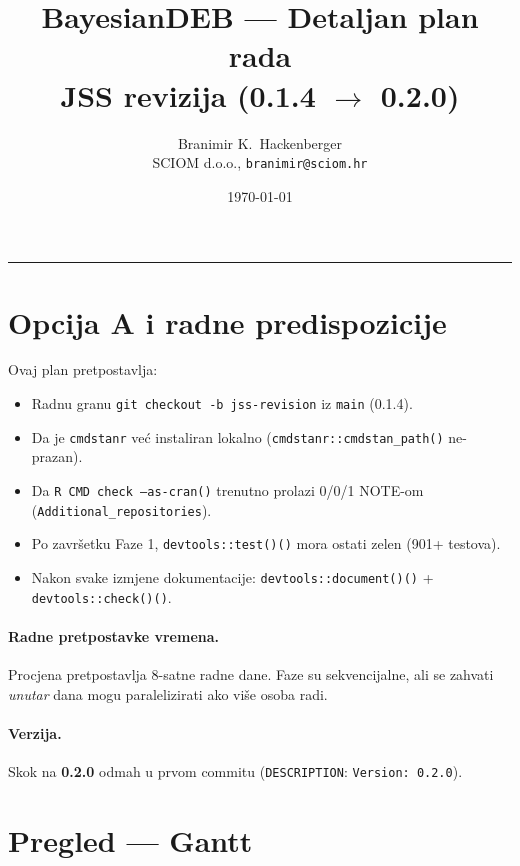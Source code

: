 \documentclass[11pt,a4paper]{article}
\title{\textbf{BayesianDEB --- Detaljan plan rada \\ \large JSS revizija (0.1.4 $\rightarrow$ 0.2.0)}}
\author{Branimir K.~Hackenberger \\ \small SCIOM d.o.o., \texttt{branimir@sciom.hr}}
\date{\today}
\newcommand{\file}[1]{\texttt{\small #1}}
\newcommand{\fn}[1]{\texttt{\small #1()}}
\newcommand{\code}[1]{\texttt{\small #1}}
\begin{document}
\maketitle
\thispagestyle{fancy}

\tableofcontents
\bigskip\hrule\bigskip

\section{Opcija A i radne predispozicije}

Ovaj plan pretpostavlja:
\begin{itemize}[leftmargin=1.4em,nosep]
  \item Radnu granu \code{git checkout -b jss-revision} iz \code{main} (0.1.4).
  \item Da je \code{cmdstanr} već instaliran lokalno
    (\code{cmdstanr::cmdstan\_path()} ne-prazan).
  \item Da \fn{R CMD check --as-cran} trenutno prolazi 0/0/1
    NOTE-om (\texttt{Additional\_repositories}).
  \item Po završetku Faze 1, \fn{devtools::test()} mora ostati zelen
    (901+ testova).
  \item Nakon svake izmjene dokumentacije: \fn{devtools::document()} +
    \fn{devtools::check()}.
\end{itemize}

\paragraph{Radne pretpostavke vremena.} Procjena pretpostavlja
8-satne radne dane.  Faze su sekvencijalne, ali se zahvati
\emph{unutar} dana mogu paralelizirati ako više osoba radi.

\paragraph{Verzija.} Skok na \textbf{0.2.0} odmah u prvom commitu
(\file{DESCRIPTION}: \code{Version: 0.2.0}).

\section{Pregled --- Gantt}
\end{document}
